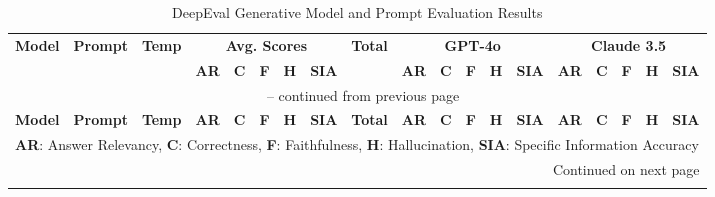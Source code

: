 \begin{landscape}
    \footnotesize
    \setlength{\tabcolsep}{3pt}       %
    \renewcommand{\arraystretch}{0.9}  %
    \setlength{\LTleft}{0pt}          %
    \setlength{\LTright}{0pt}         %
    \begin{longtable}{|l|c|c|ccccc|c|ccccc|ccccc|}
        \caption{DeepEval Generative Model and Prompt Evaluation Results}
        \label{tab:deepeval_results} \\

        \toprule
        \textbf{Model} & \textbf{Prompt} & \textbf{Temp} & \multicolumn{5}{c|}{\textbf{Avg. Scores}} & \textbf{Total} & \multicolumn{5}{c|}{\textbf{GPT-4o}} & \multicolumn{5}{c|}{\textbf{Claude 3.5}} \\
        & & & \textbf{AR} & \textbf{C} & \textbf{F} & \textbf{H} & \textbf{SIA} & & \textbf{AR} & \textbf{C} & \textbf{F} & \textbf{H} & \textbf{SIA} & \textbf{AR} & \textbf{C} & \textbf{F} & \textbf{H} & \textbf{SIA} \\
        \midrule
        \endfirsthead

        \multicolumn{19}{c}{\tablename\ \thetable{} -- continued from previous page} \\
        \midrule
        \textbf{Model} & \textbf{Prompt} & \textbf{Temp} & \textbf{AR} & \textbf{C} & \textbf{F} & \textbf{H} & \textbf{SIA} & \textbf{Total} & \textbf{AR} & \textbf{C} & \textbf{F} & \textbf{H} & \textbf{SIA} & \textbf{AR} & \textbf{C} & \textbf{F} & \textbf{H} & \textbf{SIA} \\
        \midrule
        \endhead

        \midrule
        \multicolumn{19}{l}{\footnotesize{\textbf{AR}: Answer Relevancy, \textbf{C}: Correctness, \textbf{F}: Faithfulness, \textbf{H}: Hallucination, \textbf{SIA}: Specific Information Accuracy}} \\
        \multicolumn{19}{r}{Continued on next page} \\ 
        \endfoot


\end{longtable}
\end{landscape}
